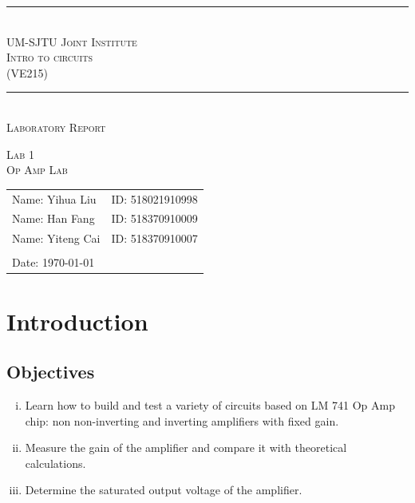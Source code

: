 \documentclass[a4paper]{report}
\begin{document}
	\renewcommand\thesection{\arabic{section}}
	\begin{Large}
		\begin{center}
			\setlength{\baselineskip}{14pt}
			\vspace{1.25cm}
			\rule[0cm]{11.2cm}{0.03em}\\
			\vspace{0.5cm}
			\textsc{UM-SJTU Joint Institute}\\
			\vspace{0.25cm}
			\textsc{Intro to circuits\\(VE215)}
			\vspace{0.3cm}
			\rule[0cm]{11.8cm}{0.05em}
			\vspace{4.9cm}\\
			\textsc{Laboratory Report}
		\end{center}
	\end{Large}
	\vspace{0.85cm}
	\begin{large}
		\begin{center}
			\textsc{Lab 1}
			\vspace{1em}\\
			\textsc{Op Amp Lab}
		\end{center}
		\vspace{6cm}
	\end{large}
	\begin{tabular}{l l}
	Name: Yihua Liu&ID: 518021910998\\
	Name: Han Fang&ID: 518370910009\\
	Name: Yiteng Cai&ID: 518370910007\\
	&\\
	Date: \today&\\
	\end{tabular}
	\thispagestyle{empty}
	\newpage
	\section{Introduction}
	\subsection{Objectives}
	\begin{enumerate}[i.]
		\item Learn how to build and test a variety of circuits based on LM 741 Op Amp chip: non non-inverting and inverting amplifiers with fixed gain.
		\item Measure the gain of the amplifier and compare it with theoretical calculations.
		\item Determine the saturated output voltage of the amplifier.
	\end{enumerate}
\end{document}

